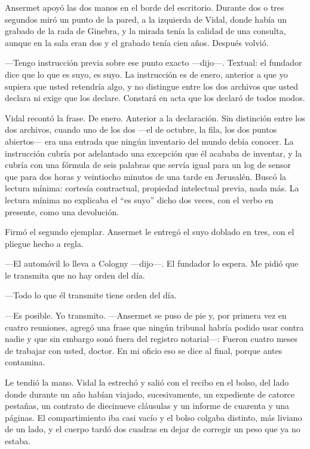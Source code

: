 Ansermet apoyó las dos manos en el borde del escritorio. Durante dos o tres segundos miró un punto de la pared, a la izquierda de Vidal, donde había un grabado de la rada de Ginebra, y la mirada tenía la calidad de una consulta, aunque en la sala eran dos y el grabado tenía cien años. Después volvió.

---Tengo instrucción previa sobre ese punto exacto ---dijo---. Textual: el fundador dice que lo que es suyo, es suyo. La instrucción es de enero, anterior a que yo supiera que usted retendría algo, y no distingue entre los dos archivos que usted declara ni exige que los declare. Constará en acta que los declaró de todos modos.

Vidal recontó la frase. De enero. Anterior a la declaración. Sin distinción entre los dos archivos, cuando uno de los dos ---el de octubre, la fila, los dos puntos abiertos--- era una entrada que ningún inventario del mundo debía conocer. La instrucción cubría por adelantado una excepción que él acababa de inventar, y la cubría con una fórmula de seis palabras que servía igual para un log de sensor que para dos horas y veintiocho minutos de una tarde en Jerusalén. Buscó la lectura mínima: cortesía contractual, propiedad intelectual previa, nada más. La lectura mínima no explicaba el ``es suyo'' dicho dos veces, con el verbo en presente, como una devolución.

Firmó el segundo ejemplar. Ansermet le entregó el suyo doblado en tres, con el pliegue hecho a regla.

---El automóvil lo lleva a Cologny ---dijo---. El fundador lo espera. Me pidió que le transmita que no hay orden del día.

---Todo lo que él transmite tiene orden del día.

---Es posible. Yo transmito. ---Ansermet se puso de pie y, por primera vez en cuatro reuniones, agregó una frase que ningún tribunal habría podido usar contra nadie y que sin embargo sonó fuera del registro notarial---: Fueron cuatro meses de trabajar con usted, doctor. En mi oficio eso se dice al final, porque antes contamina.

Le tendió la mano. Vidal la estrechó y salió con el recibo en el bolso, del lado donde durante un año habían viajado, sucesivamente, un expediente de catorce pestañas, un contrato de diecinueve cláusulas y un informe de cuarenta y una páginas. El compartimiento iba casi vacío y el bolso colgaba distinto, más liviano de un lado, y el cuerpo tardó dos cuadras en dejar de corregir un peso que ya no estaba.

